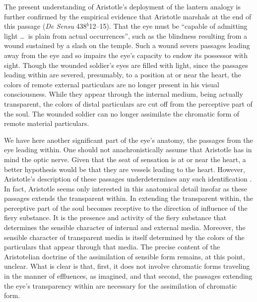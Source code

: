 The present understanding of Aristotle's deployment of the lantern analogy is further confirmed by the empirical evidence that Aristotle marshals at the end of this passage (\emph{De Sensu} 438\( ^{b} \)12--15). That the eye must be ``capable of admitting light \ldots\ is plain from actual occurrences'', such as the blindness resulting from a wound sustained by a slash on the temple. Such a wound severs passages leading away from the eye and so impairs the eye's capacity to endow its possessor with sight. Though the wounded soldier's eyes are filled with light, since the passages leading within are severed, presumably, to a position at or near the heart, the colors of remote external particulars are no longer present in his visual consciousness. While they appear through the internal medium, being actually transparent, the colors of distal particulars are cut off from the perceptive part of the soul. The wounded soldier can no longer assimilate the chromatic form of remote material particulars.

We have here another significant part of the eye's anatomy, the passages from the eye leading within. One should not anachronistically assume that Aristotle has in mind the optic nerve. Given that the seat of sensation is at or near the heart, a better hypothesis would be that they are vessels leading to the heart. However, Aristotle's description of these passages underdetermines any such identification \citep[see][]{Lloyd:1978fk}. In fact, Aristotle seems only interested in this anatomical detail insofar as these passages extends the transparent within. In extending the transparent within, the perceptive part of the soul becomes receptive to the direction of influence of the fiery substance. It is the presence and activity of the fiery substance that determines the sensible character of internal and external media. Moreover, the sensible character of transparent media is itself determined by the colors of the particulars that appear through that media. The precise content of the Aristotelian doctrine of the assimilation of sensible form remains, at this point, unclear. What is clear is that, first, it does not involve chromatic forms traveling in the manner of effluences, as \citet[\textsc{i} 1]{Hobbes:1651fk} imagined, and that second, the passages extending the eye's transparency within are necessary for the assimilation of chromatic form. 

